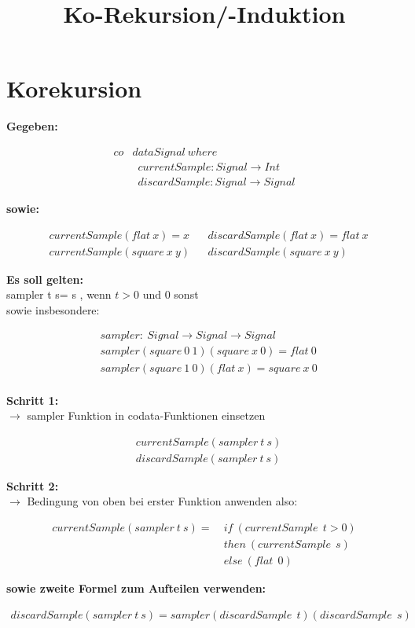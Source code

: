 \documentclass{article}
\title{Ko-Rekursion/-Induktion}
\date{ }
\begin{document}
	\maketitle
	\section{Korekursion}
	\textbf{Gegeben:}
		\begin{fleqn}
				\begin{align*}
					co&data Signal\:where  \\
					& \enspace currentSample : Signal \rightarrow Int \\
					& \enspace discardSample : Signal \rightarrow Signal
				\end{align*}
		\end{fleqn}
	\textbf{sowie:}
	\begin{fleqn}
	\begin{align*}
		&currentSample(flat\:x) = x			&
		&discardSample(flat\:x) = flat\:x	\\
		&currentSample(square\:x\:y)		&
		&discardSample(square\:x\:y)		
	\end{align*}	
	\end{fleqn}
	\textbf{Es soll gelten:}\\
	sampler t s\enspace = s , wenn $t>0$ und 0 sonst\\
	sowie insbesondere:
	\begin{fleqn}
	\begin{align*}
		&sampler:\:Signal\rightarrow Signal\rightarrow Signal \\
		&sampler(square\:0\:1)(square\:x\:0) = flat\:0 \\
		&sampler(square\:1\:0)(flat\:x) = square\:x\:0  \\
	\end{align*}	
	\end{fleqn}
	\textbf{Schritt 1:}\\
	$\rightarrow$ sampler Funktion in codata-Funktionen einsetzen
	\begin{fleqn}
	\begin{align*}
		&currentSample(sampler\:t\:s)\\
		&discardSample(sampler\:t\:s)	
	\end{align*}	
	\end{fleqn}
	\textbf{Schritt 2:}\\
	$\rightarrow$ Bedingung von oben bei erster Funktion anwenden also:
	\begin{fleqn}
		\begin{align*}
			currentSample(sampler\:t\:s) = \:&if\:(currentSample\:\:t>0)\\
											&then\:(currentSample\:\:s)\\
											&else\:(flat\:\:0)
		\end{align*}
	\end{fleqn}
	\textbf{sowie zweite Formel zum Aufteilen verwenden:}
		\begin{fleqn}
		\begin{align*}
			discardSample(sampler\:t\:s) = sampler(discardSample\:\:t)(discardSample\:\:s)
		\end{align*}
	\end{fleqn}
	\newpage
\end{document}
